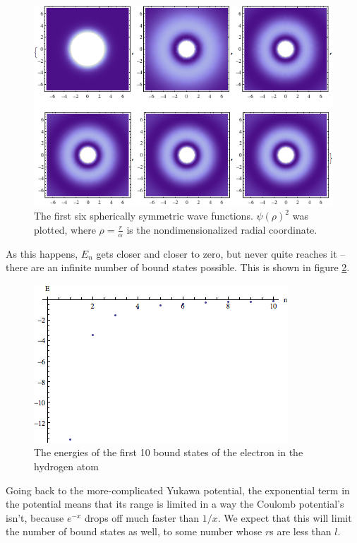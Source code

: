 \documentclass[12pt,twoside]{reedthesis}
\newcommand{\fig}[2]{\begin{figure}\begin{center}#1\end{center}#2\end{figure}}
\begin{document}
\fig{
\includegraphics[scale=0.7]{Figures/densityplots}
}{
\caption{The first six spherically symmetric wave functions. $\psi(\rho)^2$ was plotted, where $\rho = \frac{r}{\alpha}$ is the nondimensionalized radial coordinate.}
\label{fig:hfuncs}
}
As this happens, $E_n$ gets closer and closer to zero, but never quite reaches it -- there are an infinite number of bound states possible. This is shown in figure \ref{fig:hspec}.
\begin{figure}[h]
\begin{center}
\includegraphics[scale=0.7]{Figures/hydrogenspectrum}
\end{center}
\caption{The energies of the first 10 bound states of the electron in the hydrogen atom}
\label{fig:hspec}
\end{figure}

Going back to the more-complicated Yukawa potential, the exponential term in the potential means that its range is limited in a way the Coulomb potential's isn't, because $e^{-x}$ drops off much faster than $1/x$. We expect that this will limit the number of bound states as well, to some number whose $r$s are less than $l$.
\end{document}
